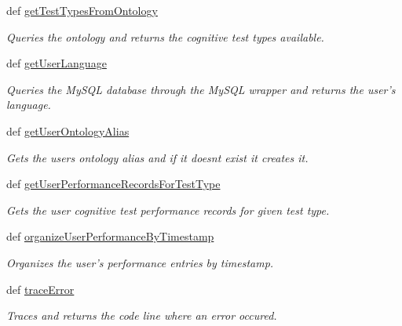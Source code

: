 \begin{DoxyCompactItemize}
def \hyperlink{classhelper__functions_1_1CognitiveExerciseHelperFunctions_afe782783345ebcf8cb2228b8379786c4}{get\-Test\-Types\-From\-Ontology}
\begin{DoxyCompactList}\small\item\em Queries the ontology and returns the cognitive test types available. \end{DoxyCompactList}\item 
def \hyperlink{classhelper__functions_1_1CognitiveExerciseHelperFunctions_a41f7e6e6342f8dc016a3bfd349f69167}{get\-User\-Language}
\begin{DoxyCompactList}\small\item\em Queries the My\-S\-Q\-L database through the My\-S\-Q\-L wrapper and returns the user's language. \end{DoxyCompactList}\item 
def \hyperlink{classhelper__functions_1_1CognitiveExerciseHelperFunctions_a4165e639bb258e4ff0b7954d8596b96d}{get\-User\-Ontology\-Alias}
\begin{DoxyCompactList}\small\item\em Gets the users ontology alias and if it doesnt exist it creates it. \end{DoxyCompactList}\item 
def \hyperlink{classhelper__functions_1_1CognitiveExerciseHelperFunctions_a22a95ff40ea4c5de8751484dca12d425}{get\-User\-Performance\-Records\-For\-Test\-Type}
\begin{DoxyCompactList}\small\item\em Gets the user cognitive test performance records for given test type. \end{DoxyCompactList}\item 
def \hyperlink{classhelper__functions_1_1CognitiveExerciseHelperFunctions_a60d24a04497455fdbf8d12a3d968de4b}{organize\-User\-Performance\-By\-Timestamp}
\begin{DoxyCompactList}\small\item\em Organizes the user's performance entries by timestamp. \end{DoxyCompactList}\item 
def \hyperlink{classhelper__functions_1_1CognitiveExerciseHelperFunctions_ac64c1327d1888871fa1dbb79e2402052}{trace\-Error}
\begin{DoxyCompactList}\small\item\em Traces and returns the code line where an error occured. \end{DoxyCompactList}\end{DoxyCompactItemize}


